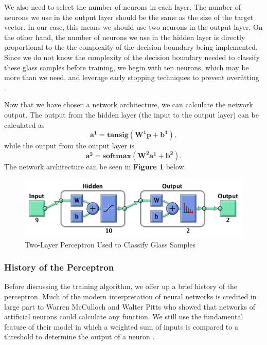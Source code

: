 \documentclass[12pt,halfline,a4paper]{ouparticle}
\begin{document}
We also need to select the number of neurons in each layer. The number of neurons we use in the output layer should be the same as the size of the target vector. In our case, this means we should use two neurons in the output layer. On the other hand, the number of neurons we use in the hidden layer is directly proportional to the the complexity of the decision boundary being implemented. Since we do not know the complexity of the decision boundary needed to classify these glass samples before training, we begin with ten neurons, which may be more than we need, and leverage early stopping techniques to prevent overfitting \cite{hagan2014}. 

Now that we have chosen a network architecture, we can calculate the network output. The output from the hidden layer (the input to the output layer) can be calculated as 
\begin{equation}
\mathbf{a^{1}} = \textbf{tansig}(\mathbf{W^{1}}\mathbf{p} + \mathbf{b^{1}}), 
\end{equation}
while the output from the output layer is 
\begin{equation}
\mathbf{a^{2}} = \textbf{softmax}(\mathbf{W^{2}}\mathbf{a^{1}} + \mathbf{b^{2}}). 
\end{equation}
The network architecture can be seen in \textbf{Figure 1} below. 
\begin{figure}[H]
\includegraphics[width = 6in]{figs/network.png}
\caption{Two-Layer Perceptron Used to Classify Glass Samples}
\end{figure}

\subsubsection{History of the Perceptron}
\label{sec4.1.1}
Before discussing the training algorithm, we offer up a brief history of the perceptron. Much of the modern interpretation of neural networks is credited in large part to Warren McCulloch and Walter Pitts who showed that networks of artificial neurons could calculate any function. We still use the fundamental feature of their model in which a weighted sum of inputs is compared to a threshold to determine the output of a neuron \cite{hagan2014}.
\end{document}
